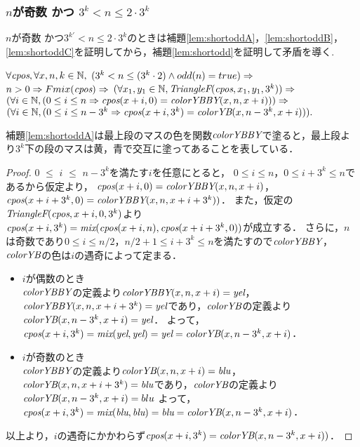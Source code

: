 \subsubsection{$n$が奇数 かつ $3^{k} < n \leq 2 \cdot 3^{k}$}
$n$が奇数 かつ$3^{k'} < n \leq 2 \cdot 3^{k}$のときは補題\ref{lem:shortoddA}，\ref{lem:shortoddB}，\ref{lem:shortoddC}を証明してから，補題\ref{lem:shortodd}を証明して矛盾を導く.
\begin{lem}[\ShortOddA] \label{lem:shortoddA}
  $\forall \textit{cpos}, \forall x, n, k \in \mathbb{N},$
  $(3^k < n \leq (3^k\cdot2) \land odd(n) = true) \Rightarrow$
  $n > 0  \Rightarrow Fmix(\textit{cpos}) \Rightarrow $
  $(\forall x_1, y_1 \in \mathbb{N}, \textit{TriangleF}(\textit{cpos},x_1,y_1,3^k)) \Rightarrow$
  $(\forall i \in \mathbb{N}, (0 \leq i \leq n \Rightarrow \textit{cpos}(x+i,0) = \textit{colorYBBY}(x,n,x+i))) \Rightarrow$
  $(\forall i \in \mathbb{N}, (0 \leq i \leq n - 3^k \Rightarrow \textit{cpos}(x+i,3^k) = \textit{colorYB}(x,n-3^k,x+i))).$
\end{lem}
補題\ref{lem:shortoddA}は最上段のマスの色を関数$\textit{colorYBBY}$で塗ると，最上段より$3^k$下の段のマスは黄，青で交互に塗ってあることを表している．
\begin{proof}
  $0$ $\leq$ $i$ $\leq$ $n-3^k$を満たす$i$を任意にとると，
  $0 \leq i \leq n$，$0 \leq i+3^k \leq n$であるから仮定より，
  $\textit{cpos}(x+i,0) = \textit{colorYBBY}(x,n,x+i)$，
  $\textit{cpos}(x+i+3^k,0) = \textit{colorYBBY}(x,n,x+i+3^k))$．
  また，仮定の$\textit{TriangleF}(\textit{cpos},x+i,0,3^k)$より
  $\textit{cpos}(x+i,3^k)=\textit{mix}(\textit{cpos}(x+i,n),\textit{cpos}(x+i+3^k,0))$が成立する．
  さらに，$n$は奇数であり$0 \leq i \leq n/2$，$n/2+1 \leq i+3^k \leq n$を満たすので$\textit{colorYBBY}$，$\textit{colorYB}$の色は$i$の遇奇によって定まる．
  \begin{itemize}
  \item
    $i$が偶数のとき \\
    $\textit{colorYBBY}$の定義より$\textit{colorYBBY}(x,n,x+i)=\textit{yel}$，$\textit{colorYBBY}(x,n,x+i+3^k)=\textit{yel}$であり，$\textit{colorYB}$の定義より$\textit{colorYB}(x,n-3^k,x+i)=\textit{yel}$．
    よって，$\textit{cpos}(x+i,3^k)=\textit{mix}(\textit{yel},\textit{yel})=\textit{yel}=\textit{colorYB}(x,n-3^k,x+i)$．
  \item
    $i$が奇数のとき \\
    $\textit{colorYBBY}$の定義より$\textit{colorYB}(x,n,x+i)=\textit{blu}$，$\textit{colorYB}(x,n,x+i+3^k)=\textit{blu}$であり，$\textit{colorYB}$の定義より$\textit{colorYB}(x,n-3^k,x+i)=blu$
    よって，$\textit{cpos}(x+i,3^k)=\textit{mix}(\textit{blu},\textit{blu})=\textit{blu}=\textit{colorYB}(x,n-3^k,x+i)$．
  \end{itemize}
  以上より，$i$の遇奇にかかわらず$\textit{cpos}(x+i,3^k) = \textit{colorYB}(x,n-3^k,x+i))$．
\end{proof}

